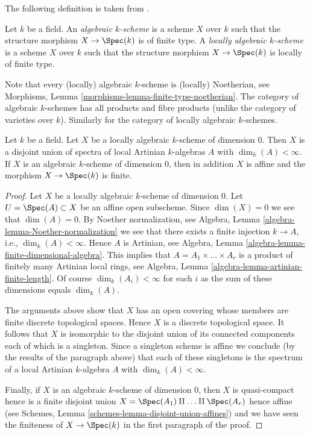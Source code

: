 \noindent
The following definition is taken from
\cite[I Definition 6.4.1]{EGA}.

\begin{definition}
\label{definition-algebraic-scheme}
Let $k$ be a field. An {\it algebraic $k$-scheme} is a scheme $X$ over $k$
such that the structure morphism $X \to \Spec(k)$ is of
finite type. A {\it locally algebraic $k$-scheme} is a scheme $X$ over $k$
such that the structure morphism $X \to \Spec(k)$ is
locally of finite type.
\end{definition}

\noindent
Note that every (locally) algebraic $k$-scheme is (locally) Noetherian, see
Morphisms, Lemma \ref{morphisms-lemma-finite-type-noetherian}.
The category of algebraic $k$-schemes has all products and fibre products
(unlike the category of varieties over $k$). Similarly for the category
of locally algebraic $k$-schemes.

\begin{lemma}
\label{lemma-algebraic-scheme-dim-0}
Let $k$ be a field. Let $X$ be a locally algebraic $k$-scheme of
dimension $0$. Then $X$ is a disjoint union of spectra of local Artinian
$k$-algebras $A$ with $\dim_k(A) < \infty$. If $X$ is an algebraic $k$-scheme
of dimension $0$, then in addition $X$ is affine and the morphism
$X \to \Spec(k)$ is finite.
\end{lemma}

\begin{proof}
Let $X$ be a locally algebraic $k$-scheme of dimension $0$.
Let $U = \Spec(A) \subset X$ be an affine open subscheme.
Since $\dim(X) = 0$ we see that $\dim(A) = 0$.
By Noether normalization, see
Algebra, Lemma \ref{algebra-lemma-Noether-normalization}
we see that there exists a finite injection $k \to A$, i.e.,
$\dim_k(A) < \infty$. Hence $A$ is Artinian, see
Algebra, Lemma \ref{algebra-lemma-finite-dimensional-algebra}.
This implies that $A = A_1 \times \ldots \times A_r$ is a product
of finitely many Artinian local rings, see
Algebra, Lemma \ref{algebra-lemma-artinian-finite-length}.
Of course $\dim_k(A_i) < \infty$ for each $i$ as the sum of
these dimensions equals $\dim_k(A)$.

\medskip\noindent
The arguments above show that $X$ has an open covering whose members are
finite discrete topological spaces. Hence $X$ is a discrete topological space.
It follows that $X$ is isomorphic to the disjoint union of its connected
components each of which is a singleton. Since a singleton scheme is affine
we conclude (by the results of the paragraph above) that each of these
singletons is the spectrum of a local Artinian $k$-algebra $A$ with
$\dim_k(A) < \infty$.

\medskip\noindent
Finally, if $X$ is an algebraic $k$-scheme of dimension $0$, then
$X$ is quasi-compact hence is a finite disjoint union
$X = \Spec(A_1) \amalg \ldots \amalg \Spec(A_r)$
hence affine (see
Schemes, Lemma \ref{schemes-lemma-disjoint-union-affines})
and we have seen the finiteness of $X \to \Spec(k)$ in the
first paragraph of the proof.
\end{proof}


